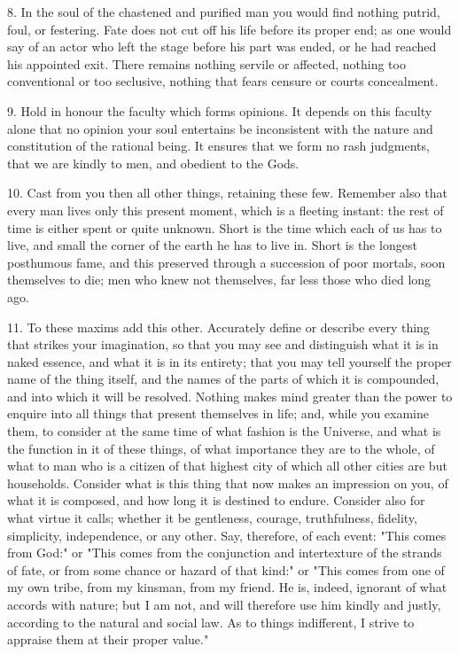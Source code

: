 \documentclass{book}
\begin{document}
8. In the soul of the chastened and purified man you would find
nothing putrid, foul, or festering. Fate does not cut off his life
before its proper end; as one would say of an actor who left the stage
before his part was ended, or he had reached his appointed exit. There
remains nothing servile or affected, nothing too conventional or too
seclusive, nothing that fears censure or courts concealment.

9. Hold in honour the faculty which forms opinions. It depends on this
faculty alone that no opinion your soul entertains be inconsistent
with the nature and constitution of the rational being. It ensures
that we form no rash judgments, that we are kindly to men, and
obedient to the Gods.

10. Cast from you then all other things, retaining these few. Remember
also that every man lives only this present moment, which is a
fleeting instant: the rest of time is either spent or quite
unknown. Short is the time which each of us has to live, and small the
corner of the earth he has to live in.  Short is the longest
posthumous fame, and this preserved through a succession of poor
mortals, soon themselves to die; men who knew not themselves, far less
those who died long ago.

11. To these maxims add this other. Accurately define or describe
every thing that strikes your imagination, so that you may see and
distinguish what it is in naked essence, and what it is in its
entirety; that you may tell yourself the proper name of the thing
itself, and the names of the parts of which it is compounded, and into
which it will be resolved. Nothing makes mind greater than the power
to enquire into all things that present themselves in life; and, while
you examine them, to consider at the same time of what fashion is the
Universe, and what is the function in it of these things, of what
importance they are to the whole, of what to man who is a citizen of
that highest city of which all other cities are but households.
Consider what is this thing that now makes an impression on you, of
what it is composed, and how long it is destined to endure. Consider
also for what virtue it calls; whether it be gentleness, courage,
truthfulness, fidelity, simplicity, independence, or any other. Say,
therefore, of each event: "This comes from God:" or "This comes from
the conjunction and intertexture of the strands of fate, or from some
chance or hazard of that kind:" or "This comes from one of my own
tribe, from my kinsman, from my friend. He is, indeed, ignorant of
what accords with nature; but I am not, and will therefore use him
kindly and justly, according to the natural and social law. As to
things indifferent, I strive to appraise them at their proper value."
\end{document}
